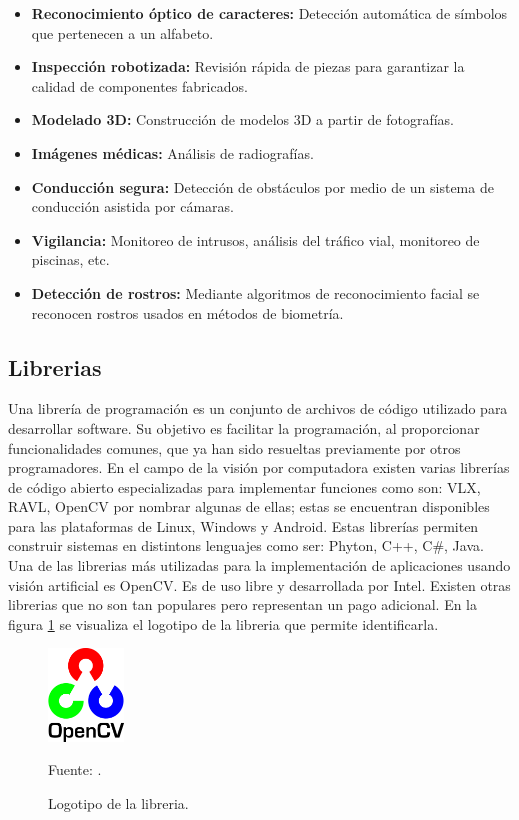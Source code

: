 \begin{itemize}
    \item \textbf{Reconocimiento óptico de caracteres:} Detección automática de símbolos que pertenecen a un alfabeto.
    \item \textbf{Inspección robotizada:} Revisión rápida de piezas para garantizar la calidad de componentes fabricados.
    \item \textbf{Modelado 3D:} Construcción de modelos 3D a partir de fotografías.
    \item \textbf{Imágenes médicas:} Análisis de radiografías.
    \item \textbf{Conducción segura:} Detección de obstáculos por medio de un sistema de conducción asistida por cámaras.
    \item \textbf{Vigilancia:} Monitoreo de intrusos, análisis del tráfico vial, monitoreo de piscinas, etc.
    \item \textbf{Detección de rostros:} Mediante algoritmos de reconocimiento facial se reconocen rostros usados en métodos de biometría.
\end{itemize}

\subsection{Librerias}
Una librería de programación es un conjunto de archivos de código utilizado para desarrollar software. Su objetivo es facilitar la programación, al proporcionar funcionalidades comunes, que ya han sido resueltas previamente por otros programadores. En el campo de la visión por computadora existen varias librerías de código abierto especializadas para implementar funciones como son: VLX, RAVL, OpenCV por nombrar algunas de ellas; estas se encuentran disponibles para las plataformas de Linux, Windows y Android. Estas librerías permiten construir sistemas en distintons lenguajes como ser: Phyton, C++, C\#, Java.\\

Una de las librerias más utilizadas para la implementación de aplicaciones usando visión artificial es OpenCV. Es de uso libre y desarrollada por Intel. Existen otras librerias que no son tan populares pero representan un pago adicional. En la figura \ref{fig:cv2_logo} se visualiza el logotipo de la libreria que permite identificarla.\\

\begin{figure}[H]
    \begin{center}
        \includegraphics[width=2cm]{img/capitulo_2/cv2_logo.png}
    \end{center}
    \begin{center}
        \caption{Logotipo de la libreria.}
        Fuente: \cite{opencv}.
        \label{fig:cv2_logo}    
    \end{center}
\end{figure}

